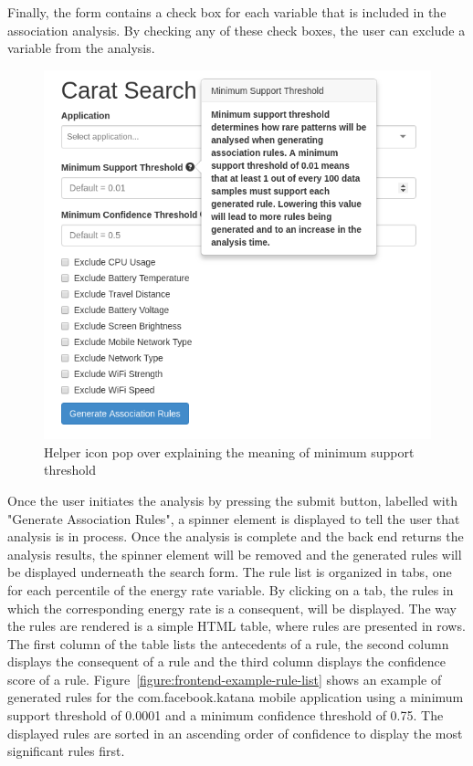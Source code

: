 Finally, the form contains a check box for each variable that is included in the association analysis. By checking any of these check boxes, the user can exclude a variable from the analysis. 

\begin{figure} %
	\centering
	\includegraphics[width=\textwidth]{images/frontend/frontend_helper_icons.png}
	\caption{Helper icon pop over explaining the meaning of minimum support threshold}
	\label{figure:frontend-icon-pop-over}
\end{figure}

Once the user initiates the analysis by pressing the submit button, labelled with "Generate Association Rules", a spinner element is displayed to tell the user that analysis is in process. Once the analysis is complete and the back end returns the analysis results, the spinner element will be removed and the generated rules will be displayed underneath the search form. The rule list is organized in tabs, one for each percentile of the energy rate variable. By clicking on a tab, the rules in which the corresponding energy rate is a consequent, will be displayed. The way the rules are rendered is a simple HTML table, where rules are presented in rows. The first column of the table lists the antecedents of a rule, the second column displays the consequent of a rule and the third column displays the confidence score of a rule. Figure~\ref{figure:frontend-example-rule-list} shows an example of generated rules for the com.facebook.katana mobile application using a minimum support threshold of 0.0001 and a minimum confidence threshold of 0.75. The displayed rules are sorted in an ascending order of confidence to display the most significant rules first.      

